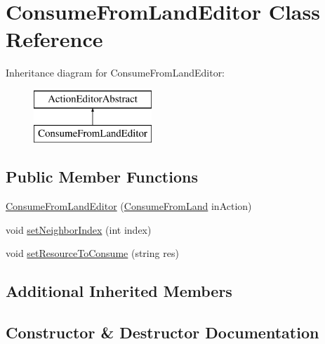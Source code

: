 \hypertarget{class_consume_from_land_editor}{}\section{Consume\+From\+Land\+Editor Class Reference}
\label{class_consume_from_land_editor}
Inheritance diagram for Consume\+From\+Land\+Editor\+:\begin{figure}[H]
\begin{center}
\leavevmode
\includegraphics[height=2.000000cm]{class_consume_from_land_editor}
\end{center}
\end{figure}
\subsection*{Public Member Functions}
\begin{DoxyCompactItemize}
\item 
\mbox{\hyperlink{class_consume_from_land_editor_a7f47060c9426914caeb00cc78db6cf74}{Consume\+From\+Land\+Editor}} (\mbox{\hyperlink{class_consume_from_land}{Consume\+From\+Land}} in\+Action)
\item 
void \mbox{\hyperlink{class_consume_from_land_editor_a8c3ecdabdf02fc94888ed16665f0850c}{set\+Neighbor\+Index}} (int index)
\item 
void \mbox{\hyperlink{class_consume_from_land_editor_a656aefcc2ccf0562992d48a59c8148de}{set\+Resource\+To\+Consume}} (string res)
\end{DoxyCompactItemize}
\subsection*{Additional Inherited Members}


\subsection{Constructor \& Destructor Documentation}
\mbox{\label{class_consume_from_land_editor_a7f47060c9426914caeb00cc78db6cf74}} 
